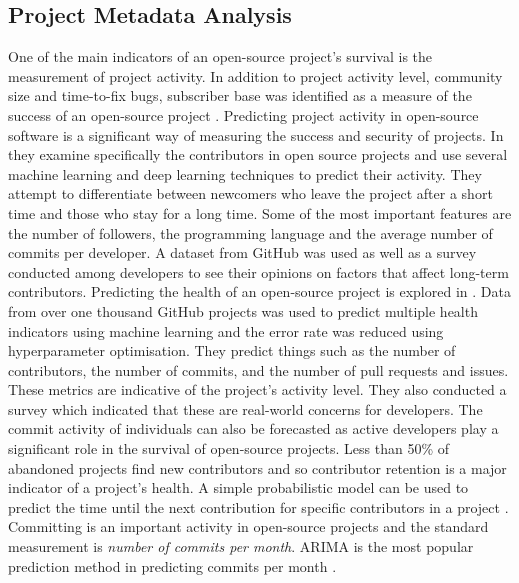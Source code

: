 \documentclass[conference]{IEEEtran}
\begin{document}
\subsection{Project Metadata Analysis}
One of the main indicators of an open-source project's survival is the measurement of project activity. In addition to project activity level, community size and time-to-fix bugs, subscriber base was identified as a measure of the success of an open-source project \cite{sen_open_2012}. Predicting project activity in open-source software is a significant way of measuring the success and security of projects. In \cite{l_bao_large_2021} they examine specifically the contributors in open source projects and use several machine learning and deep learning techniques to predict their activity. They attempt to differentiate between newcomers who leave the project after a short time and those who stay for a long time. Some of the most important features are the number of followers, the programming language and the average number of commits per developer. A dataset from GitHub was used as well as a survey conducted among developers to see their opinions on factors that affect long-term contributors. Predicting the health of an open-source project is explored in \cite{xia_predicting_2022}. Data from over one thousand GitHub projects was used to predict multiple health indicators using machine learning and the error rate was reduced using hyperparameter optimisation. They predict things such as the number of contributors, the number of commits, and the number of pull requests and issues. These metrics are indicative of the project’s activity level. They also conducted a survey which indicated that these are real-world concerns for developers. The commit activity of individuals can also be forecasted as active developers play a significant role in the survival of open-source projects. Less than 50\% of abandoned projects find new contributors and so contributor retention is a major indicator of a project's health. A simple probabilistic model can be used to predict the time until the next contribution for specific contributors in a project \cite{decan_gap_2020}. Committing is an important activity in open-source projects and the standard measurement is \textit{number of commits per month}. ARIMA is the most popular prediction method in predicting commits per month \cite{chahal_fuzzy_2016}.
\end{document}
